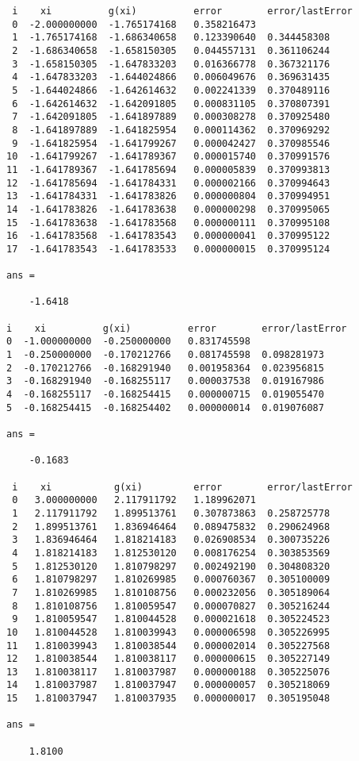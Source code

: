 \documentclass{article}
\begin{document}
\begin{lstlisting}
 i    xi          g(xi)          error        error/lastError
 0  -2.000000000  -1.765174168   0.358216473
 1  -1.765174168  -1.686340658   0.123390640  0.344458308
 2  -1.686340658  -1.658150305   0.044557131  0.361106244
 3  -1.658150305  -1.647833203   0.016366778  0.367321176
 4  -1.647833203  -1.644024866   0.006049676  0.369631435
 5  -1.644024866  -1.642614632   0.002241339  0.370489116
 6  -1.642614632  -1.642091805   0.000831105  0.370807391
 7  -1.642091805  -1.641897889   0.000308278  0.370925480
 8  -1.641897889  -1.641825954   0.000114362  0.370969292
 9  -1.641825954  -1.641799267   0.000042427  0.370985546
10  -1.641799267  -1.641789367   0.000015740  0.370991576
11  -1.641789367  -1.641785694   0.000005839  0.370993813
12  -1.641785694  -1.641784331   0.000002166  0.370994643
13  -1.641784331  -1.641783826   0.000000804  0.370994951
14  -1.641783826  -1.641783638   0.000000298  0.370995065
15  -1.641783638  -1.641783568   0.000000111  0.370995108
16  -1.641783568  -1.641783543   0.000000041  0.370995122
17  -1.641783543  -1.641783533   0.000000015  0.370995124

ans =

    -1.6418

i    xi          g(xi)          error        error/lastError
0  -1.000000000  -0.250000000   0.831745598
1  -0.250000000  -0.170212766   0.081745598  0.098281973
2  -0.170212766  -0.168291940   0.001958364  0.023956815
3  -0.168291940  -0.168255117   0.000037538  0.019167986
4  -0.168255117  -0.168254415   0.000000715  0.019055470
5  -0.168254415  -0.168254402   0.000000014  0.019076087

ans =

    -0.1683

 i    xi           g(xi)         error        error/lastError
 0   3.000000000   2.117911792   1.189962071
 1   2.117911792   1.899513761   0.307873863  0.258725778
 2   1.899513761   1.836946464   0.089475832  0.290624968
 3   1.836946464   1.818214183   0.026908534  0.300735226
 4   1.818214183   1.812530120   0.008176254  0.303853569
 5   1.812530120   1.810798297   0.002492190  0.304808320
 6   1.810798297   1.810269985   0.000760367  0.305100009
 7   1.810269985   1.810108756   0.000232056  0.305189064
 8   1.810108756   1.810059547   0.000070827  0.305216244
 9   1.810059547   1.810044528   0.000021618  0.305224523
10   1.810044528   1.810039943   0.000006598  0.305226995
11   1.810039943   1.810038544   0.000002014  0.305227568
12   1.810038544   1.810038117   0.000000615  0.305227149
13   1.810038117   1.810037987   0.000000188  0.305225076
14   1.810037987   1.810037947   0.000000057  0.305218069
15   1.810037947   1.810037935   0.000000017  0.305195048

ans =

    1.8100

\end{lstlisting}
\end{document}
